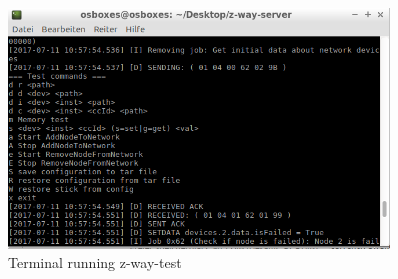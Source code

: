 \begin{figure}
\begin{center}
\includegraphics[width=0.9\textwidth]{pngs/cap11/libterminal.png}
\caption{Terminal running z-way-test}
\label{libterminal}
\end{center}
\end{figure}

